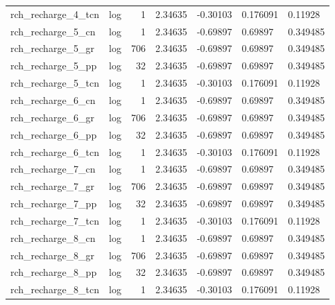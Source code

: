 \documentclass{article}
\begin{document}
\begin{center}
\begin{landscape}
\begin{longtable}{llrllll}
 rch\_recharge\_4\_tcn &       log &      1 &        2.34635 &       -0.30103 &       0.176091 &            0.11928 \\
  rch\_recharge\_5\_cn &       log &      1 &        2.34635 &       -0.69897 &        0.69897 &           0.349485 \\
  rch\_recharge\_5\_gr &       log &    706 &        2.34635 &       -0.69897 &        0.69897 &           0.349485 \\
  rch\_recharge\_5\_pp &       log &     32 &        2.34635 &       -0.69897 &        0.69897 &           0.349485 \\
 rch\_recharge\_5\_tcn &       log &      1 &        2.34635 &       -0.30103 &       0.176091 &            0.11928 \\
  rch\_recharge\_6\_cn &       log &      1 &        2.34635 &       -0.69897 &        0.69897 &           0.349485 \\
  rch\_recharge\_6\_gr &       log &    706 &        2.34635 &       -0.69897 &        0.69897 &           0.349485 \\
  rch\_recharge\_6\_pp &       log &     32 &        2.34635 &       -0.69897 &        0.69897 &           0.349485 \\
 rch\_recharge\_6\_tcn &       log &      1 &        2.34635 &       -0.30103 &       0.176091 &            0.11928 \\
  rch\_recharge\_7\_cn &       log &      1 &        2.34635 &       -0.69897 &        0.69897 &           0.349485 \\
  rch\_recharge\_7\_gr &       log &    706 &        2.34635 &       -0.69897 &        0.69897 &           0.349485 \\
  rch\_recharge\_7\_pp &       log &     32 &        2.34635 &       -0.69897 &        0.69897 &           0.349485 \\
 rch\_recharge\_7\_tcn &       log &      1 &        2.34635 &       -0.30103 &       0.176091 &            0.11928 \\
  rch\_recharge\_8\_cn &       log &      1 &        2.34635 &       -0.69897 &        0.69897 &           0.349485 \\
  rch\_recharge\_8\_gr &       log &    706 &        2.34635 &       -0.69897 &        0.69897 &           0.349485 \\
  rch\_recharge\_8\_pp &       log &     32 &        2.34635 &       -0.69897 &        0.69897 &           0.349485 \\
 rch\_recharge\_8\_tcn &       log &      1 &        2.34635 &       -0.30103 &       0.176091 &            0.11928 \\

\end{longtable}
\end{landscape}
\end{center}
\end{document}
